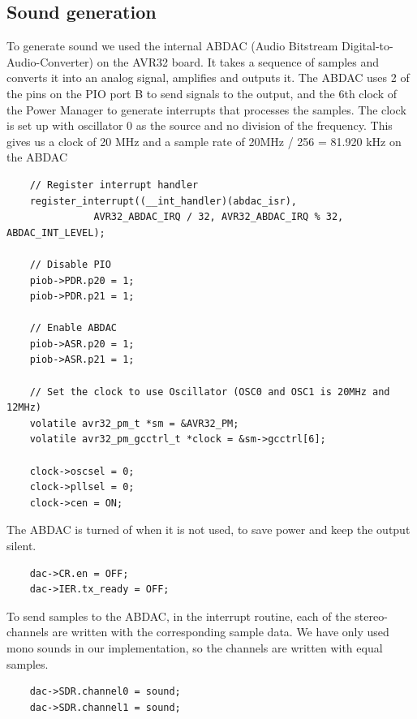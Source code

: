 \subsection{Sound generation}
To generate sound we used the internal ABDAC (Audio Bitstream Digital-to-Audio-Converter)
on the AVR32 board. It takes a sequence of samples and converts it into an analog
signal, amplifies and outputs it.
The ABDAC uses 2 of the pins on the PIO port B to send signals to the output, and the
6th clock of the Power Manager to generate interrupts that processes the samples.
The clock is set up with oscillator 0 as the source and no division of the frequency.
This gives us a clock of 20 MHz and a sample rate of 20MHz / 256 = 81.920 kHz on the ABDAC\\
\begin{lstlisting}
	// Register interrupt handler
	register_interrupt((__int_handler)(abdac_isr),
			   AVR32_ABDAC_IRQ / 32, AVR32_ABDAC_IRQ % 32, ABDAC_INT_LEVEL);

	// Disable PIO
	piob->PDR.p20 = 1;
	piob->PDR.p21 = 1;

	// Enable ABDAC
	piob->ASR.p20 = 1;
	piob->ASR.p21 = 1;

	// Set the clock to use Oscillator (OSC0 and OSC1 is 20MHz and 12MHz)
	volatile avr32_pm_t *sm = &AVR32_PM;
	volatile avr32_pm_gcctrl_t *clock = &sm->gcctrl[6];

	clock->oscsel = 0;
	clock->pllsel = 0;
	clock->cen = ON;
\end{lstlisting}
The ABDAC is turned of when it is not used, to save power and keep the output silent.\\
\begin{lstlisting}
	dac->CR.en = OFF;
	dac->IER.tx_ready = OFF;
\end{lstlisting}
To send samples to the ABDAC, in the interrupt routine, each of the stereo-channels are written with the corresponding sample data. We have only used mono sounds in our implementation, so the channels are written with equal samples.\\
\begin{lstlisting}
	dac->SDR.channel0 = sound;
	dac->SDR.channel1 = sound;
\end{lstlisting}

